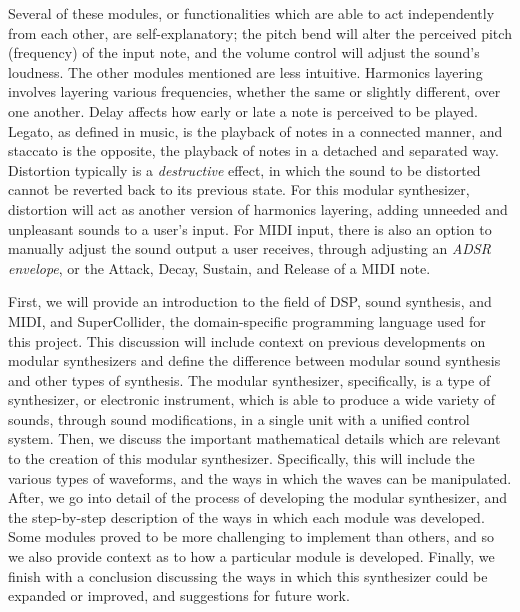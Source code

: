 Several of these modules, or functionalities which are able to act independently from each other, are self-explanatory; the pitch bend will alter the perceived pitch (frequency) of the input note, and the volume control will adjust the sound's loudness. The other modules mentioned are less intuitive. Harmonics layering involves layering various frequencies, whether the same or slightly different, over one another. Delay affects how early or late a note is perceived to be played. Legato, as defined in music, is the playback of notes in a connected manner, and staccato is the opposite, the playback of notes in a detached and separated way. Distortion typically is a \textit{destructive} effect, in which the sound to be distorted cannot be reverted back to its previous state. For this modular synthesizer, distortion will act as another version of harmonics layering, adding unneeded and unpleasant sounds to a user's input. For MIDI input, there is also an option to manually adjust the sound output a user receives, through adjusting an \textit{ADSR envelope}, or the Attack, Decay, Sustain, and Release of a MIDI note.

First, we will provide an introduction to the field of DSP, sound synthesis, and MIDI, and SuperCollider, the domain-specific programming language used for this project. This discussion will include context on previous developments on modular synthesizers and define the difference between modular sound synthesis and other types of synthesis. The modular synthesizer, specifically, is a type of synthesizer, or electronic instrument, which is able to produce a wide variety of sounds, through sound modifications, in a single unit with a unified control system. Then, we discuss the important mathematical details which are relevant to the creation of this modular synthesizer. Specifically, this will include the various types of waveforms, and the ways in which the waves can be manipulated. After, we go into detail of the process of developing the modular synthesizer, and the step-by-step description of the ways in which each module was developed. Some modules proved to be more challenging to implement than others, and so we also provide context as to how a particular module is developed. Finally, we finish with a conclusion discussing the ways in which this synthesizer could be expanded or improved, and suggestions for future work.